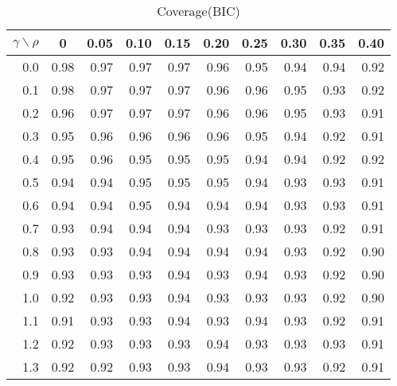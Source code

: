 \documentclass[12pt]{article}
\begin{document}
%
\begin{table}[!tbp]
\caption{Coverage(BIC)}
 \begin{center}
 \begin{tabular}{r|rrrrrrrrr}\hline\hline
\multicolumn{1}{c|}{$\gamma\backslash\rho$}&\multicolumn{1}{c}{0}&\multicolumn{1}{c}{0.05}&\multicolumn{1}{c}{0.10}&\multicolumn{1}{c}{0.15}&\multicolumn{1}{c}{0.20}&\multicolumn{1}{c}{0.25}&\multicolumn{1}{c}{0.30}&\multicolumn{1}{c}{0.35}&\multicolumn{1}{c}{0.40}\tabularnewline
\hline
0.0&0.98&0.97&0.97&0.97&0.96&0.95&0.94&0.94&0.92\tabularnewline
0.1&0.98&0.97&0.97&0.97&0.96&0.96&0.95&0.93&0.92\tabularnewline
0.2&0.96&0.97&0.97&0.97&0.96&0.96&0.95&0.93&0.91\tabularnewline
0.3&0.95&0.96&0.96&0.96&0.96&0.95&0.94&0.92&0.91\tabularnewline
0.4&0.95&0.96&0.95&0.95&0.95&0.94&0.94&0.92&0.92\tabularnewline
0.5&0.94&0.94&0.95&0.95&0.95&0.94&0.93&0.93&0.91\tabularnewline
0.6&0.94&0.94&0.95&0.94&0.94&0.94&0.93&0.93&0.91\tabularnewline
0.7&0.93&0.94&0.94&0.94&0.93&0.93&0.93&0.92&0.91\tabularnewline
0.8&0.93&0.93&0.94&0.94&0.94&0.94&0.93&0.92&0.90\tabularnewline
0.9&0.93&0.93&0.93&0.94&0.93&0.94&0.93&0.92&0.90\tabularnewline
1.0&0.92&0.93&0.93&0.94&0.93&0.93&0.93&0.92&0.90\tabularnewline
1.1&0.91&0.93&0.93&0.94&0.93&0.94&0.93&0.92&0.91\tabularnewline
1.2&0.92&0.93&0.93&0.93&0.94&0.93&0.93&0.93&0.91\tabularnewline
1.3&0.92&0.92&0.93&0.93&0.94&0.93&0.93&0.92&0.91\tabularnewline
\hline
\end{tabular}

\end{center}

\end{table}
\end{document}
